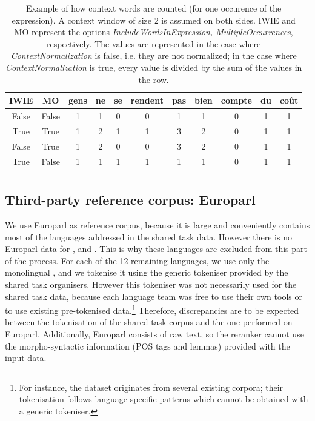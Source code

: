 \documentclass[output=paper
,modfonts
,nonflat]{langsci/langscibook}
\begin{document}
 \begin{table}
{\small
\begin{tabular}{ccccccccccc}
\lsptoprule
 IWIE & MO & gens & ne & {\bf se} & {\bf rendent} & pas & bien & {\bf compte} & du & coût \\
\midrule
  
  False   &      False                       & 1 & 1 & 0 & 0& 1& 1& 0& 1& 1 \\

  True&           True                       &1&2&1&1&3&2&0&1&1\\

  False    &      True                       &1&2&0&0&3&2&0&1&1 \\


  True &          False                       &1&1&1&1&1&1&0&1&1\\
\lspbottomrule

\end{tabular}
}
\caption{\label{tab:contextExample}{Example of how context words are counted (for one occurence of the expression).} A context window of size 2 is assumed on both sides. IWIE and MO represent the options {\em IncludeWordsInExpression, MultipleOccurrences}, respectively. The values are represented in the case where {\em ContextNormalization} is false, i.e. they are not normalized; in the case where {\em ContextNormalization} is true, every value is divided by the sum of the values in the row.}
\end{table}



\subsection{Third-party reference corpus: Europarl}
\label{subsec:europarl}

We use Europarl \citep{europarl} as reference corpus, because it is
large and conveniently contains most of the languages addressed in the
shared task data. However there is no Europarl data for , 
and . This is why these languages are excluded from this part
of the process. For each of the 12 remaining languages, we use only
the monolingual , and we tokenise it using the generic
tokeniser provided by the shared task organisers. However this
tokeniser was not necessarily used for the shared task data, because
each language team was free to use their own tools or to use existing
pre-tokenised data.\footnote{For instance, the  dataset
  originates from several existing corpora; their tokenisation follows
  language-specific patterns which cannot be obtained with a generic
  tokeniser.}  Therefore, discrepancies are to be expected between the
tokenisation of the shared task corpus and the one performed on
Europarl. Additionally, Europarl consists of raw text, so the reranker
cannot use the morpho-syntactic information (POS tags and lemmas)
provided with the input data.
\end{document}
